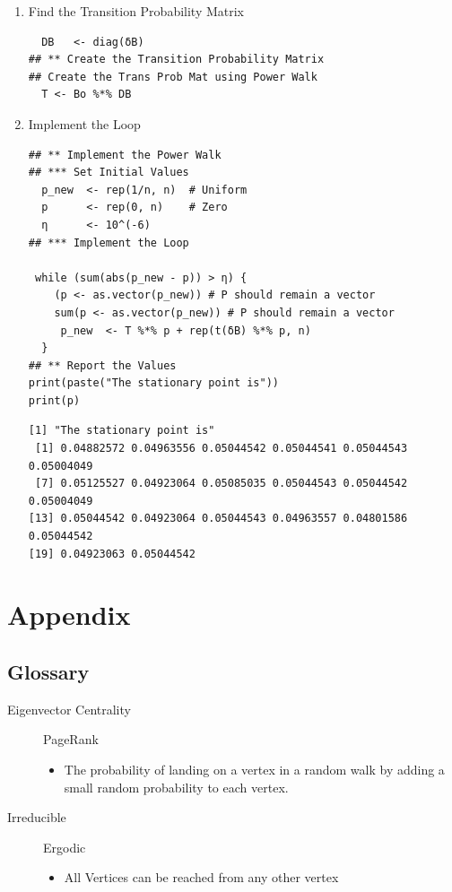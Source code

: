 \documentclass[11pt]{article}
\begin{document}
\begin{enumerate}
\begin{enumerate}
\begin{enumerate}
\item Find the Transition Probability Matrix
\label{sec:org32e403f}
\lstset{language=r,label= ,caption= ,captionpos=b,numbers=none}
\begin{lstlisting}
  DB   <- diag(δB)
## ** Create the Transition Probability Matrix
## Create the Trans Prob Mat using Power Walk
  T <- Bo %*% DB
\end{lstlisting}

\item Implement the Loop
\label{sec:org4976c09}
\lstset{language=r,label= ,caption= ,captionpos=b,numbers=none}
\begin{lstlisting}
## ** Implement the Power Walk
## *** Set Initial Values
  p_new  <- rep(1/n, n)  # Uniform
  p      <- rep(0, n)    # Zero
  η      <- 10^(-6)
## *** Implement the Loop

 while (sum(abs(p_new - p)) > η) {
    (p <- as.vector(p_new)) # P should remain a vector
    sum(p <- as.vector(p_new)) # P should remain a vector
     p_new  <- T %*% p + rep(t(δB) %*% p, n)
  }
## ** Report the Values
print(paste("The stationary point is"))
print(p)
\end{lstlisting}

\begin{verbatim}
[1] "The stationary point is"
 [1] 0.04882572 0.04963556 0.05044542 0.05044541 0.05044543 0.05004049
 [7] 0.05125527 0.04923064 0.05085035 0.05044543 0.05044542 0.05004049
[13] 0.05044542 0.04923064 0.05044543 0.04963557 0.04801586 0.05044542
[19] 0.04923063 0.05044542
\end{verbatim}
\end{enumerate}
\end{enumerate}
\end{enumerate}
\section{Appendix}
\label{sec:org266620c}
\subsection{Glossary}
\label{sec:orgd1569fc}
\begin{description}
\item[{Eigenvector Centrality}] PageRank
\begin{itemize}
\item The probability of landing on a vertex in a random walk by adding a small random probability to each vertex.
\end{itemize}
\item[{Irreducible}] Ergodic
\begin{itemize}
\item All Vertices can be reached from any other vertex
\end{itemize}
\end{description}
\end{document}
